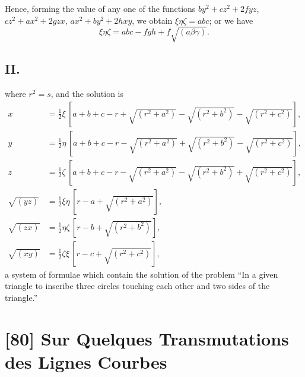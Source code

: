 \documentclass[11pt,a4paper]{book}
\begin{document}
Hence, forming the value of any one of the functions $by^2 + cz^2 + 2fyz$, $cz^2 + ax^2 + 2gzx$, $ax^2 + by^2 + 2hxy$, we obtain $\xi\eta\zeta = abc$; or we have
\[
\xi\eta\zeta = abc - fgh + f\sqrt{(a\beta\gamma)}.
\]

\subsection*{II.}

where $r^2 = s$, and the solution is
\begin{align*}
x &= \tfrac{1}{2}\xi\,[a + b + c - r + \sqrt{(r^2 + a^2)} - \sqrt{(r^2 + b^2)} - \sqrt{(r^2 + c^2)}], \\
y &= \tfrac{1}{2}\eta\,[a + b + c - r - \sqrt{(r^2 + a^2)} + \sqrt{(r^2 + b^2)} - \sqrt{(r^2 + c^2)}], \\
z &= \tfrac{1}{2}\zeta\,[a + b + c - r - \sqrt{(r^2 + a^2)} - \sqrt{(r^2 + b^2)} + \sqrt{(r^2 + c^2)}], \\
\sqrt{(yz)} &= \tfrac{1}{2}\xi\eta\,[r - a + \sqrt{(r^2 + a^2)}], \\
\sqrt{(zx)} &= \tfrac{1}{2}\eta\zeta\,[r - b + \sqrt{(r^2 + b^2)}], \\
\sqrt{(xy)} &= \tfrac{1}{2}\zeta\xi\,[r - c + \sqrt{(r^2 + c^2)}],
\end{align*}
a system of formulae which contain the solution of the problem ``In a given triangle to inscribe three circles touching each other and two sides of the triangle.''

\newpage
\section*{[80] Sur Quelques Transmutations des Lignes Courbes}

\bigskip
\end{document}

